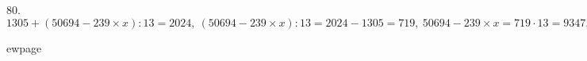80. $1305+(50694-239\times x):13=2024,\ (50694-239\times x):13=2024-1305=719,\ 50694-239\times x=719\cdot13=9347,\ 239\times x=50694-9347=41347,\ x=41347:239=173.$

ewpage
